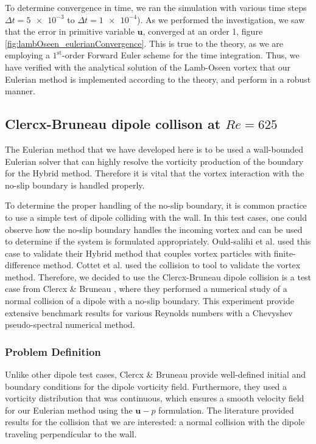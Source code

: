 To determine convergence in time, we ran the simulation with various time steps $\Delta t = \num{5e-3}$ to $\Delta t = \num{1e-4}$). As we performed the investigation, we saw that the error in primitive variable $\mathbf{u}$, converged at an order 1, figure \ref{fig:lambOseen_eulerianConvergence}. This is true to the theory, as we are employing a $1^{\mathrm{st}}$-order Forward Euler scheme for the time integration. Thus, we have verified with the analytical solution of the Lamb-Oseen vortex that our Eulerian method is implemented according to the theory, and perform in a robust manner.

\subsection{Clercx-Bruneau dipole collison at $Re=625$}
\label{subsec:eul_cbdc}
The Eulerian method that we have developed here is to be used a wall-bounded Eulerian solver that can highly resolve the vorticity production of the boundary for the Hybrid method. Therefore it is vital that the vortex interaction with the no-slip boundary is handled properly.

To determine the proper handling of the no-slip boundary, it is common practice to use a simple test of dipole colliding with the wall. In this test cases, one could observe how the no-slip boundary handles the incoming vortex and can be used to determine if the system is formulated appropriately.  Ould-salihi et al. \cite{Ould-Salihi2001a} used this case to validate their Hybrid method that couples vortex particles with finite-difference method. Cottet et al. \cite{Cottet2000b} used the collision to tool to validate the vortex method. Therefore, we decided to use the Clercx-Bruneau dipole collision is a test case from Clercx \& Bruneau \cite{Clercx2006a}, where they performed a numerical study of a normal collision of a dipole with a no-slip boundary. This experiment provide extensive benchmark results for various Reynolds numbers with a Chevyshev pseudo-spectral numerical method. 

\subsubsection*{Problem Definition}

Unlike other dipole test cases, Clercx \& Bruneau provide well-defined initial and boundary conditions for the dipole vorticity field. Furthermore, they used a vorticity distribution that was continuous, which ensures a smooth velocity field for our Eulerian method using the $\mathbf{u}-p$ formulation. The literature provided results for the collision that we are interested: a normal collision with the dipole traveling perpendicular to the wall.

